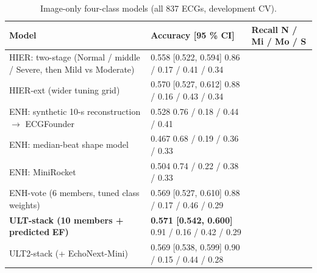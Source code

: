\begin{table}[htbp]
\caption{Image-only four-class models (all 837 ECGs, development CV).}\label{tab:4.8}
\small
\begin{tabular}{>{\raggedright\arraybackslash\hspace{0pt}}p{}>{\raggedright\arraybackslash\hspace{0pt}}p{}>{\raggedright\arraybackslash\hspace{0pt}}p{}}
\toprule
\textbf{Model} & \textbf{Accuracy [95 \% CI]} & \textbf{Recall N / Mi / Mo / S} \\
\midrule
HIER: two-stage (Normal / middle / Severe, then Mild vs Moderate) & 0.558 [0.522, 0.594] 0.86 / 0.17 / 0.41 / 0.34 &  \\
HIER-ext (wider tuning grid) & 0.570 [0.527, 0.612] 0.88 / 0.16 / 0.43 / 0.34 &  \\
ENH: synthetic 10-s reconstruction $\rightarrow$ ECGFounder & 0.528 0.76 / 0.18 / 0.44 / 0.41 &  \\
ENH: median-beat shape model & 0.467 0.68 / 0.19 / 0.36 / 0.33 &  \\
ENH: MiniRocket & 0.504 0.74 / 0.22 / 0.38 / 0.33 &  \\
ENH-vote (6 members, tuned class weights) & 0.569 [0.527, 0.610] 0.88 / 0.17 / 0.46 / 0.29 &  \\
\textbf{ULT-stack (10 members + predicted} \textbf{EF)} & \textbf{0.571 [0.542, 0.600]} 0.91 / 0.16 / 0.42 / 0.29 &  \\
ULT2-stack (+ EchoNext-Mini) & 0.569 [0.538, 0.599] 0.90 / 0.15 / 0.44 / 0.28 &  \\
\bottomrule
\end{tabular}
\end{table}
